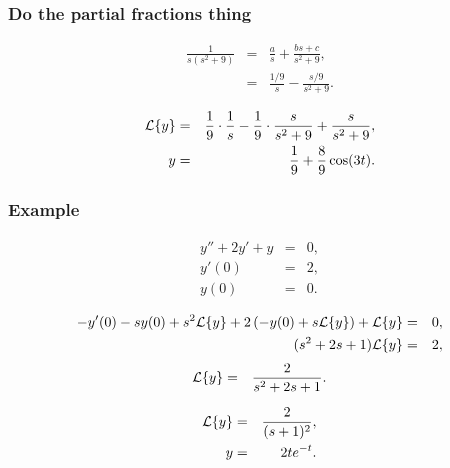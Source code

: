 \begin{frame}
  \frametitle{Do the partial fractions thing}

  \begin{eqnarray*}
    \frac{1}{s(s^2+9)} & = & \frac{a}{s} + \frac{bs+c}{s^2+9}, \\
    & = & \frac{1/9}{s} - \frac{s/9}{s^2+9}.
  \end{eqnarray*}

  {
    \begin{eqnarray*}
      \laplace{y} & = & \frac{1}{9}\cdot\frac{1}{s} - \frac{1}{9}\cdot\frac{s}{s^2+9}+\frac{s}{s^2+9}, \\
      y & = & \frac{1}{9} + \frac{8}{9}\cos(3t).
    \end{eqnarray*}
  }

\end{frame}



\begin{frame}
  \frametitle{Example}

  \begin{eqnarray*}
    y''  + 2y' + y & = & 0, \\
    y'(0) & = & 2, \\
    y(0) & = & 0.
  \end{eqnarray*}

  {
    \begin{eqnarray*}
      -y'(0) - s y(0) + s^2 \laplace{y} + 2 \lp -y(0) + s\laplace{y} \rp + \laplace{y} & = & 0, \\
      (s^2+2s+1) \laplace{y} & = & 2,
    \end{eqnarray*}
    \begin{eqnarray*}
      \laplace{y} & = & \frac{2}{s^2+2s+1}.
    \end{eqnarray*}
  }

  {
    \begin{eqnarray*}
      \laplace{y} & = & \frac{2}{(s+1)^2}, \\
      y & = & 2 t e^{-t}.
    \end{eqnarray*}
  }

\end{frame}




